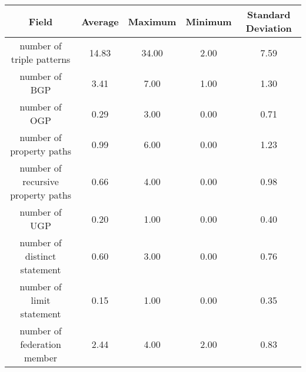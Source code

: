 \begin{center}
    \begin{tabular}{|*{5}{c|}}
     \hline
     Field & Average & Maximum & Minimum & Standard Deviation \\ 
     \hline \hline
     number of triple patterns & 14.83 & 34.00 & 2.00 & 7.59 \\ 
     \hline
     number of BGP & 3.41 & 7.00 & 1.00 & 1.30 \\ 
     \hline
     number of OGP & 0.29 & 3.00 & 0.00 & 0.71 \\ 
     \hline
     number of property paths & 0.99 & 6.00 & 0.00 & 1.23 \\ 
     \hline
     number of recursive property paths & 0.66 & 4.00 & 0.00 & 0.98 \\ 
     \hline
     number of UGP & 0.20 & 1.00 & 0.00 & 0.40 \\ 
     \hline
     number of distinct statement & 0.60 & 3.00 & 0.00 & 0.76 \\ 
     \hline
     number of limit statement & 0.15 & 1.00 & 0.00 & 0.35 \\  
     \hline
     number of federation member & 2.44 & 4.00 & 2.00 & 0.83 \\  
     \hline
    \end{tabular}
\end{center}